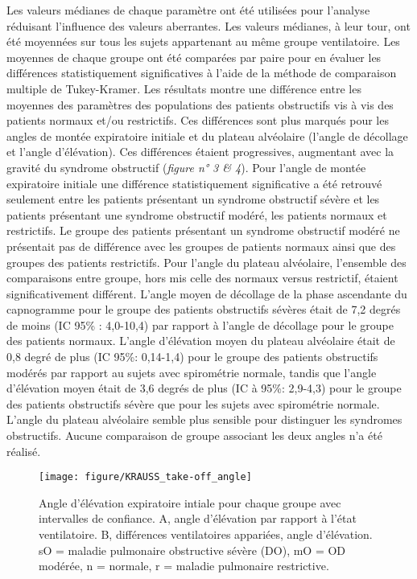 \documentclass[12pt,]{article}
\begin{document}
Les valeurs médianes de chaque paramètre ont été utilisées pour
l'analyse réduisant l'influence des valeurs aberrantes. Les valeurs
médianes, à leur tour, ont été moyennées sur tous les sujets appartenant
au même groupe ventilatoire. Les moyennes de chaque groupe ont été
comparées par paire pour en évaluer les différences statistiquement
significatives à l'aide de la méthode de comparaison multiple de
Tukey-Kramer. Les résultats montre une différence entre les moyennes des
paramètres des populations des patients obstructifs vis à vis des
patients normaux et/ou restrictifs. Ces différences sont plus marqués
pour les angles de montée expiratoire initiale et du plateau alvéolaire
(l'angle de décollage et l'angle d'élévation). Ces différences étaient
progressives, augmentant avec la gravité du syndrome obstructif
(\emph{figure n° 3 \& 4}). Pour l'angle de montée expiratoire initiale
une différence statistiquement significative a été retrouvé seulement
entre les patients présentant un syndrome obstructif sévère et les
patients présentant une syndrome obstructif modéré, les patients normaux
et restrictifs. Le groupe des patients présentant un syndrome obstructif
modéré ne présentait pas de différence avec les groupes de patients
normaux ainsi que des groupes des patients restrictifs. Pour l'angle du
plateau alvéolaire, l'ensemble des comparaisons entre groupe, hors mis
celle des normaux versus restrictif, étaient significativement
différent. L'angle moyen de décollage de la phase ascendante du
capnogramme pour le groupe des patients obstructifs sévères était de 7,2
degrés de moins (IC 95\% : 4,0-10,4) par rapport à l'angle de décollage
pour le groupe des patients normaux. L'angle d'élévation moyen du
plateau alvéolaire était de 0,8 degré de plus (IC 95\%: 0,14-1,4) pour
le groupe des patients obstructifs modérés par rapport au sujets avec
spirométrie normale, tandis que l'angle d'élévation moyen était de 3,6
degrés de plus (IC à 95\%: 2,9-4,3) pour le groupe des patients
obstructifs sévère que pour les sujets avec spirométrie normale. L'angle
du plateau alvéolaire semble plus sensible pour distinguer les syndromes
obstructifs. Aucune comparaison de groupe associant les deux angles n'a
été réalisé.

\begin{figure}[h!]

{\centering \texttt{[image: figure/KRAUSS\_take-off\_angle]} 

}

\caption{Angle d'élévation expiratoire intiale pour chaque groupe avec intervalles de confiance. A, angle d'élévation par rapport à l'état ventilatoire. B, différences ventilatoires appariées, angle d'élévation. sO = maladie pulmonaire obstructive sévère (DO), mO = OD modérée, n = normale, r = maladie pulmonaire restrictive.}\label{fig:unnamed-chunk-7}
\end{figure}
\end{document}
